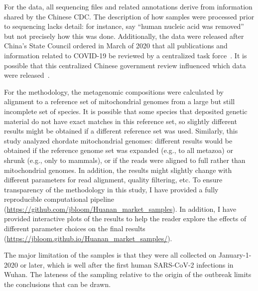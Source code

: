\documentclass[9pt,twocolumn,twoside]{gsajnl_modified}
\begin{document}
For the data, all sequencing files and related annotations derive from information shared by the Chinese CDC.
The description of how samples were processed prior to sequencing lacks detail: for instance, \citet{liu2023surveillance} say ``human nucleic acid was removed'' but not precisely how this was done.
Additionally, the data were released after China's State Council ordered in March of 2020 that all publications and information related to COVID-19 be reviewed by a centralized task force~\citep{kang2020china}.
It is possible that this centralized Chinese government review influenced which data were released~\citep{hvistendahl2023}.

For the methodology, the metagenomic compositions were calculated by alignment to a reference set of mitochondrial genomes from a large but still incomplete set of species.
It is possible that some species that deposited genetic material do not have exact matches in this reference set, so slightly different results might be obtained if a different reference set was used.
Similarly, this study analyzed chordate mitochondrial genomes: different results would be obtained if the reference genome set was expanded (e.g., to all metazoa) or shrunk (e.g., only to mammals), or if the reads were aligned to full rather than mitochondrial genomes.
In addition, the results might slightly change with different parameters for read alignment, quality filtering, etc.
To ensure transparency of the methodology in this study, I have provided a fully reproducible computational pipeline (\url{https://github.com/jbloom/Huanan_market_samples}).
In addition, I have provided interactive plots of the results to help the reader explore the effects of different parameter choices on the final results (\url{https://jbloom.github.io/Huanan_market_samples/}).

The major limitation of the samples is that they were all collected on January-1-2020 or later, which is well after the first human SARS-CoV-2 infections in Wuhan.
The lateness of the sampling relative to the origin of the outbreak limits the conclusions that can be drawn.
\end{document}

